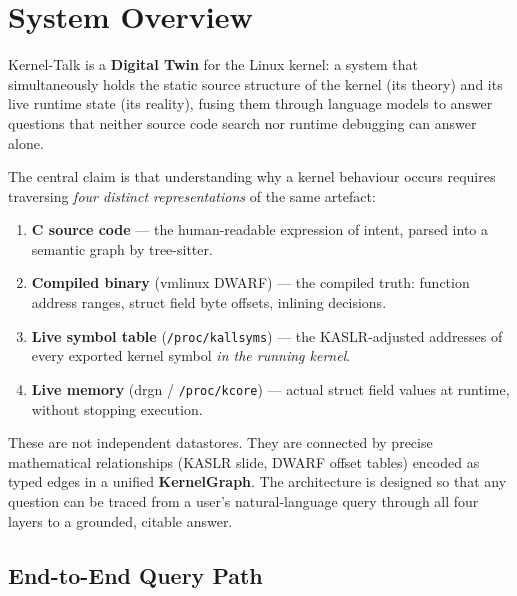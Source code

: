 \documentclass[11pt,a4paper]{article}
\begin{document}
\tableofcontents
\newpage

\section{System Overview}
\label{sec:overview}

Kernel-Talk is a \textbf{Digital Twin} for the Linux kernel: a system that
simultaneously holds the static source structure of the kernel (its theory)
and its live runtime state (its reality), fusing them through language models
to answer questions that neither source code search nor runtime debugging can
answer alone.

The central claim is that understanding why a kernel behaviour occurs requires
traversing \emph{four distinct representations} of the same artefact:

\begin{enumerate}[leftmargin=2em, itemsep=2pt]
  \item \textbf{C source code} --- the human-readable expression of intent,
        parsed into a semantic graph by tree-sitter.
  \item \textbf{Compiled binary} (vmlinux DWARF) --- the compiled truth:
        function address ranges, struct field byte offsets, inlining decisions.
  \item \textbf{Live symbol table} (\texttt{/proc/kallsyms}) --- the
        KASLR-adjusted addresses of every exported kernel symbol \emph{in the
        running kernel}.
  \item \textbf{Live memory} (drgn / \texttt{/proc/kcore}) --- actual struct
        field values at runtime, without stopping execution.
\end{enumerate}

These are not independent datastores. They are connected by precise
mathematical relationships (KASLR slide, DWARF offset tables) encoded as
typed edges in a unified \textbf{KernelGraph}. The architecture is designed
so that any question can be traced from a user's natural-language query
through all four layers to a grounded, citable answer.

\subsection{End-to-End Query Path}
\end{document}
